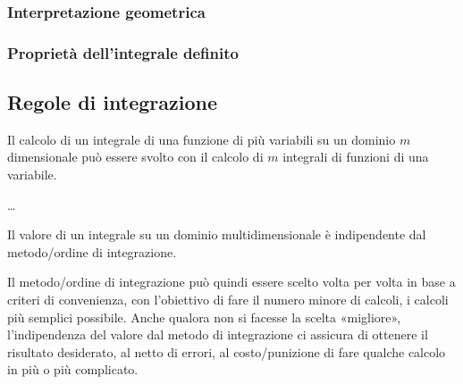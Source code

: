 \documentclass[letterpaper,10pt,italian]{jupyterBook}
\begin{document}
\subsubsection{Interpretazione geometrica}
\label{\detokenize{ch/multivariable-calculus/integrals:interpretazione-geometrica}}\label{\detokenize{ch/multivariable-calculus/integrals:multivariable-calculus-integrals-geom}}
\sphinxAtStartPar
{} 


\subsubsection{Proprietà dell’integrale definito}
\label{\detokenize{ch/multivariable-calculus/integrals:proprieta-dell-integrale-definito}}\label{\detokenize{ch/multivariable-calculus/integrals:multivariable-calculus-integrals-properties}}
\sphinxAtStartPar
{} 


\subsection{Regole di integrazione}
\label{\detokenize{ch/multivariable-calculus/integrals:regole-di-integrazione}}\label{\detokenize{ch/multivariable-calculus/integrals:multivariable-calculus-integrals-rules}}
\sphinxAtStartPar
Il calcolo di un integrale di una funzione di più variabili su un dominio \(m\)\sphinxhyphen{}dimensionale può essere svolto con il calcolo di \(m\) integrali di funzioni di una variabile.

\sphinxAtStartPar
{} …

\sphinxAtStartPar
Il valore di un integrale su un dominio multi\sphinxhyphen{}dimensionale è indipendente dal metodo/ordine di integrazione.

\sphinxAtStartPar
{} Il metodo/ordine di integrazione può quindi essere scelto volta per volta in base a criteri di convenienza, con l’obiettivo di fare il numero minore di calcoli, i calcoli più semplici possibile. Anche qualora non si facesse la scelta «migliore», l’indipendenza del valore dal metodo di integrazione ci assicura di ottenere il risultato desiderato, al netto di errori, al costo/punizione di fare qualche calcolo in più o più complicato.
\end{document}
